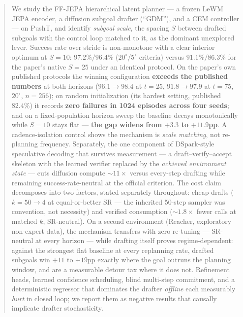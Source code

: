 \documentclass{article}
\newcommand{\ours}[1]{\textbf{#1}}          %
\newcommand{\degc}[1]{$#1^\circ$}
\begin{document}
\begin{abstract}
We study the FF-JEPA hierarchical latent planner --- a frozen LeWM JEPA encoder, a
diffusion subgoal drafter (``GDM''), and a CEM controller --- on PushT, and identify
\emph{subgoal scale}, the spacing $S$ between drafted subgoals with the control loop
matched to it, as the dominant unexplored lever. Success rate over stride is
non-monotone with a clear interior optimum at $S{=}10$: \ours{$97.2\%/96.4\%$}
(\degc{20}/\degc{5} criteria) versus $91.1\%/86.3\%$ for the paper's native $S{=}25$
under an identical protocol. On the paper's own published protocols the winning
configuration \ours{exceeds the published numbers} at both horizons ($96.1{\to}98.4$
at $t{=}25$, $91.8{\to}97.9$ at $t{=}75$, \degc{20}, $n{=}256$); on random
initialization (its hardest setting, published $82.4\%$) it records \ours{zero
failures in 1024 episodes across four seeds}; and on a fixed-population horizon sweep
the baseline decays monotonically while $S{=}10$ stays flat --- \ours{the gap widens
from $+3.3$ to $+11.9$pp}. A cadence-isolation control shows the mechanism is
\emph{scale matching}, not re-planning frequency. Separately, the one component of
DSpark-style speculative decoding that survives measurement --- a draft--verify--accept
skeleton with the learned verifier replaced by the \emph{achieved environment state}
--- cuts diffusion compute ${\sim}11\times$ versus every-step drafting while remaining
success-rate-neutral at the official criterion. The cost claim decomposes into two factors, stated separately throughout: cheap
drafts ($k{=}50\to4$ at equal-or-better SR --- the inherited 50-step sampler was
convention, not necessity) and verified consumption (${\sim}1.8\times$ fewer calls at
matched $k$, SR-neutral). On a second environment (Reacher, exploratory non-expert
data), the mechanism transfers with zero re-tuning --- SR-neutral at every horizon ---
while drafting itself proves regime-dependent: against the strongest flat baseline at
every replanning rate, drafted subgoals win $+11$ to $+19$pp exactly where the goal
outruns the planning window, and are a measurable detour tax where it does not. Refinement heads, learned confidence
scheduling, blind multi-step commitment, and a deterministic regressor that dominates
the drafter \emph{offline} each measurably \emph{hurt} in closed loop; we report them
as negative results that causally implicate drafter stochasticity.
\end{abstract}
\end{document}
